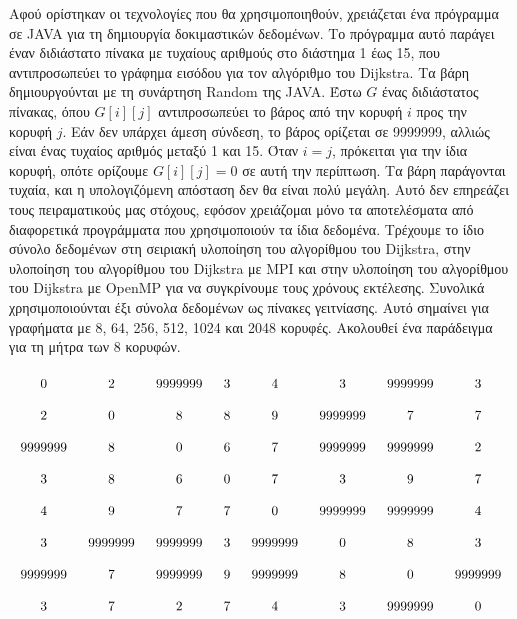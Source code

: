 \documentclass[12pt,a4paper]{article}
\begin{document}
Αφού ορίστηκαν οι τεχνολογίες που θα χρησιμοποιηθούν, χρειάζεται ένα πρόγραμμα σε \foreignlanguage{english}{JAVA} για
τη δημιουργία δοκιμαστικών δεδομένων. Το πρόγραμμα αυτό παράγει έναν διδιάστατο πίνακα
με τυχαίους αριθμούς στο διάστημα 1 έως 15, που αντιπροσωπεύει το γράφημα εισόδου για τον
αλγόριθμο του \foreignlanguage{english}{Dijkstra}. Τα βάρη δημιουργούνται με τη συνάρτηση \foreignlanguage{english}{Random} της \foreignlanguage{english}{JAVA}. Έστω
$G$ ένας διδιάστατος πίνακας, όπου $G[i][j]$ αντιπροσωπεύει το βάρος από την κορυφή $i$ προς
την κορυφή $j$. Εάν δεν υπάρχει άμεση σύνδεση, το βάρος ορίζεται σε 9999999, αλλιώς είναι
ένας τυχαίος αριθμός μεταξύ 1 και 15. Όταν $i = j$, πρόκειται για την ίδια κορυφή, οπότε
ορίζουμε $G[i][j] = 0$ σε αυτή την περίπτωση. Τα βάρη παράγονται τυχαία, και η υπολογιζόμενη
απόσταση δεν θα είναι πολύ μεγάλη. Αυτό δεν επηρεάζει τους πειραματικούς μας στόχους,
εφόσον χρειάζομαι μόνο τα αποτελέσματα από διαφορετικά προγράμματα που χρησιμοποιούν τα
ίδια δεδομένα. Τρέχουμε το ίδιο σύνολο δεδομένων στη σειριακή υλοποίηση του αλγορίθμου του \foreignlanguage{english}{Dijkstra}, στην υλοποίηση του αλγορίθμου του \foreignlanguage{english}{Dijkstra} με \foreignlanguage{english}{MPI} και στην υλοποίηση του αλγορίθμου του \foreignlanguage{english}{Dijkstra} με
\foreignlanguage{english}{OpenMP} για να συγκρίνουμε τους χρόνους εκτέλεσης. Συνολικά
χρησιμοποιούνται έξι σύνολα δεδομένων ως πίνακες γειτνίασης. Αυτό σημαίνει για γραφήματα με 8, 64, 256,
512, 1024 και 2048 κορυφές. Ακολουθεί ένα παράδειγμα για τη μήτρα των 8 κορυφών.
\vspace{0.3cm}
\[
    \begingroup
    \setlength{\arraycolsep}{8pt}%
    \renewcommand{\arraystretch}{2}%
    \begin{array}{cccccccc}
        0 & 2 & 9999999 & 3 & 4 & 3 & 9999999 & 3 \\
        2 & 0 & 8 & 8 & 9 & 9999999 & 7 & 7 \\
        9999999 & 8 & 0 & 6 & 7 & 9999999 & 9999999 & 2 \\
        3 & 8 & 6 & 0 & 7 & 3 & 9 & 7 \\
        4 & 9 & 7 & 7 & 0 & 9999999 & 9999999 & 4 \\
        3 & 9999999 & 9999999 & 3 & 9999999 & 0 & 8 & 3 \\
        9999999 & 7 & 9999999 & 9 & 9999999 & 8 & 0 & 9999999 \\
        3 & 7 & 2 & 7 & 4 & 3 & 9999999 & 0 \\
    \end{array}
    \endgroup
\]
\vspace{0.3cm}
\end{document}

